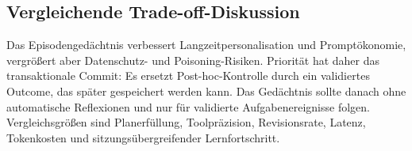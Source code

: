 \subsection{Vergleichende Trade-off-Diskussion}

Das Episodengedächtnis verbessert Langzeitpersonalisation und Promptökonomie,
vergrößert aber Datenschutz- und Poisoning-Risiken. Priorität hat daher das
transaktionale Commit: Es ersetzt Post-hoc-Kontrolle durch ein validiertes
Outcome, das später gespeichert werden kann. Das Gedächtnis sollte danach ohne
automatische Reflexionen und nur für validierte Aufgabenereignisse folgen.
Vergleichsgrößen sind Planerfüllung, Toolpräzision, Revisionsrate, Latenz,
Tokenkosten und sitzungsübergreifender Lernfortschritt.
